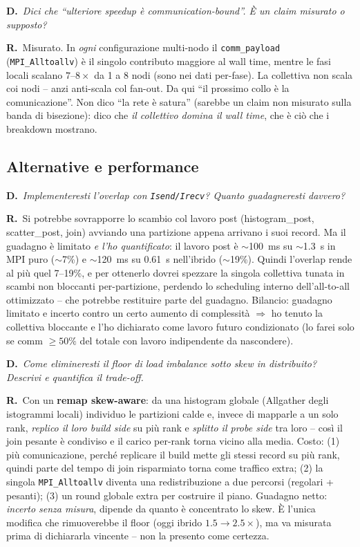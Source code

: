 \documentclass[11pt,a4paper]{article}
\newcommand{\D}[1]{\begin{dom}\small\textbf{D.}\ \itshape #1\end{dom}}
\newcommand{\R}{\noindent\textbf{R.}\ }
\begin{document}
\D{Dici che ``ulteriore speedup è communication-bound''. È un claim misurato o supposto?}
\R Misurato. In \emph{ogni} configurazione multi-nodo il \texttt{comm\_payload} (\texttt{MPI\_Alltoallv}) è il singolo contributo maggiore al wall time, mentre le fasi locali scalano $7$--$8\times$ da 1 a 8 nodi (sono nei dati per-fase). La collettiva non scala coi nodi -- anzi anti-scala col fan-out. Da qui ``il prossimo collo è la comunicazione''. Non dico ``la rete è satura'' (sarebbe un claim non misurato sulla banda di bisezione): dico che \emph{il collettivo domina il wall time}, che è ciò che i breakdown mostrano.

\subsection{Alternative e performance}

\D{Implementeresti l'overlap con \texttt{Isend/Irecv}? Quanto guadagneresti davvero?}
\R Si potrebbe sovrapporre lo scambio col lavoro post (histogram\_post, scatter\_post, join) avviando una partizione appena arrivano i suoi record. Ma il guadagno è limitato \emph{e l'ho quantificato}: il lavoro post è $\sim$100~ms su $\sim$1.3~s in MPI puro ($\sim$7\%) e $\sim$120~ms su 0.61~s nell'ibrido ($\sim$19\%). Quindi l'overlap rende al più quel 7--19\%, e per ottenerlo dovrei spezzare la singola collettiva tunata in scambi non bloccanti per-partizione, perdendo lo scheduling interno dell'all-to-all ottimizzato -- che potrebbe restituire parte del guadagno. Bilancio: guadagno limitato e incerto contro un certo aumento di complessità $\Rightarrow$ ho tenuto la collettiva bloccante e l'ho dichiarato come lavoro futuro condizionato (lo farei solo se comm $\ge 50\%$ del totale con lavoro indipendente da nascondere).

\D{Come elimineresti il floor di load imbalance sotto skew in distribuito? Descrivi e quantifica il trade-off.}
\R Con un \textbf{remap skew-aware}: da una histogram globale (Allgather degli istogrammi locali) individuo le partizioni calde e, invece di mapparle a un solo rank, \emph{replico il loro build side} su più rank e \emph{splitto il probe side} tra loro -- così il join pesante è condiviso e il carico per-rank torna vicino alla media. Costo: (1) più comunicazione, perché replicare il build mette gli stessi record su più rank, quindi parte del tempo di join risparmiato torna come traffico extra; (2) la singola \texttt{MPI\_Alltoallv} diventa una redistribuzione a due percorsi (regolari + pesanti); (3) un round globale extra per costruire il piano. Guadagno netto: \emph{incerto senza misura}, dipende da quanto è concentrato lo skew. È l'unica modifica che rimuoverebbe il floor (oggi ibrido $1.5\to2.5\times$), ma va misurata prima di dichiararla vincente -- non la presento come certezza.
\end{document}
